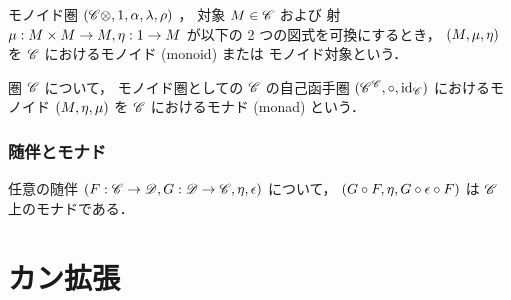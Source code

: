\documentclass[titlepage]{ltjsreport}
\newcommand{\objs}[1]{#1}
\newcommand{\mrp}[3]{{#1}:{#2}\to{#3}}
\newcommand{\id}[1]{\mathrm{id}_{#1}}
\newcommand{\Fun}[2]{{#2}^{#1}}
\begin{document}
{  \begin{definition}[モノイド]
    モノイド圏 $(\mathscr{C}\otimes,1,\alpha,\lambda,\rho)$ ，
    対象 $\monad\in\objs{\C}$ および
    射 $\mrp{\mu}{\monad\times\monad}{\monad},\mrp{\eta}{\i}{\monad}$
    が以下の 2 つの図式を可換にするとき，
    $(M,\mu,\eta)$ を $\mathscr{C}$ におけるモノイド (monoid) または
    モノイド対象という．
    \begin{center}
    \end{center}
    \begin{center}
    \end{center}
  \end{definition}

  \begin{definition}[モナド]
    圏 $\mathscr{C}$ について，
    モノイド圏としての $\mathscr{C}$ の自己函手圏
    $(\Fun{\C}{\C},\circ,\id{\C})$
    におけるモノイド $(M,\eta,\mu)$ を
    $\mathscr{C}$ におけるモナド (monad) という．
  \end{definition}

  \subsection{随伴とモナド}

  \begin{theorem}[随伴はモナドを構成する]
    任意の随伴 $(\mrp{F}{\C}{\D},\mrp{\G}{\D}{\C},\eta,\epsilon)$ について，
    $(G\circ F,\eta,G\circ\epsilon\circ F)$ は $\mathscr{C}$ 上のモナドである．
  \end{theorem}
}

\chapter{カン拡張}
\end{document}
